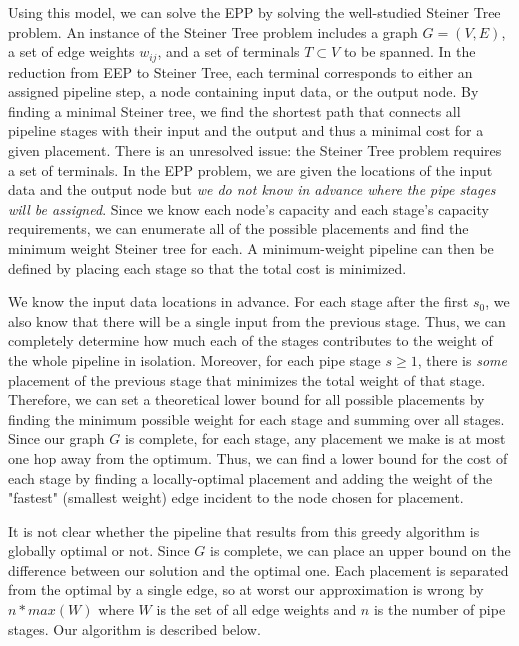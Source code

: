 \documentclass{acmart}
\begin{document}
	Using this model, we can solve the EPP by solving the well-studied Steiner Tree problem. An instance of the Steiner Tree problem includes a graph $G = (V,E)$, a set of edge weights $w_{ij}$, and a set of terminals $T \subset V$ to be spanned. In the reduction from EEP to Steiner Tree, each terminal corresponds to either an assigned pipeline step, a node containing input data, or the output node. By finding a minimal Steiner tree, we find the shortest path that connects all pipeline stages with their input and the output and thus a minimal cost for a given placement. There is an unresolved issue: the Steiner Tree problem requires a set of terminals. In the EPP problem, we are given the locations of the input data and the output node but \textit{we do not know in advance where the pipe stages will be assigned}. Since we know each node's capacity and each stage's capacity requirements, we can enumerate all of the possible placements and find the minimum weight Steiner tree for each. A minimum-weight pipeline can then be defined by placing each stage so that the total cost is minimized.
	
	We know the input data locations in advance. For each stage after the first $s_{0}$, we also know that there will be a single input from the previous stage. Thus, we can completely determine how much each of the stages contributes to the weight of the whole pipeline in isolation. Moreover, for each pipe stage $s \ge 1$, there is \textit{some} placement of the previous stage that minimizes the total weight of that stage. Therefore, we can set a theoretical lower bound for all possible placements by finding the minimum possible weight for each stage and summing over all stages. Since our graph $G$ is complete, for each stage, any placement we make is at most one hop away from the optimum. Thus, we can find a lower bound for the cost of each stage by finding a locally-optimal placement and adding the weight of the "fastest" (smallest weight) edge incident to the node chosen for placement.
	
	It is not clear whether the pipeline that results from this greedy algorithm is globally optimal or not. Since $G$ is complete, we can place an upper bound on the difference between our solution and the optimal one. Each placement is separated from the optimal by a single edge, so at worst our approximation is wrong by $n * max(W)$ where $W$ is the set of all edge weights and $n$ is the number of pipe stages. Our algorithm is described below.
	
\end{document}
